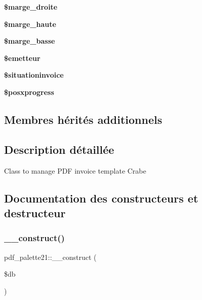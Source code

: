 \begin{DoxyCompactItemize}
\mbox{\label{classpdf__palette21_af7efceb7da1203d27f5ee48c92c390ee}} 
{\bfseries \$marge\+\_\+droite}
\item 
\mbox{\label{classpdf__palette21_a1c291597986e444140499fd3de7615a7}} 
{\bfseries \$marge\+\_\+haute}
\item 
\mbox{\label{classpdf__palette21_a7e71c788d0f031ffd05b19bf546554f7}} 
{\bfseries \$marge\+\_\+basse}
\item 
\mbox{\label{classpdf__palette21_af1cb638e56c54c36bc14504a4166800a}} 
{\bfseries \$emetteur}
\item 
\mbox{\label{classpdf__palette21_ac6e9d22c7f3ac95873d26fa528a56ee8}} 
{\bfseries \$situationinvoice}
\item 
\mbox{\label{classpdf__palette21_a5777d611c33d6a6ad9894464e13cb0a2}} 
{\bfseries \$posxprogress}
\end{DoxyCompactItemize}
\subsection*{Membres hérités additionnels}


\subsection{Description détaillée}
Class to manage P\+DF invoice template Crabe 

\subsection{Documentation des constructeurs et destructeur}
\mbox{\label{classpdf__palette21_aa3d8ae4b8658568ea0598461289322c8}} 
\subsubsection{\texorpdfstring{\+\_\+\+\_\+construct()}{\_\_construct()}}
{\footnotesize\ttfamily pdf\+\_\+palette21\+::\+\_\+\+\_\+construct (\begin{DoxyParamCaption}\item[{}]{\$db }\end{DoxyParamCaption})}

